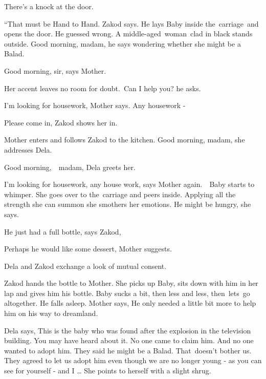 \documentclass[twoside,11pt]{book}
\begin{document}
There's a knock at the door. 

{}``That must be Hand to Hand.{\textquotedbl} Zakod says. He lays Baby inside the\ carriage\  and opens the door. He
guessed wrong. A middle-aged{\ }woman\  clad in black stands outside. {\textquotedbl}Good morning,
madam,{\textquotedbl} he says wondering whether she might be a Balad.

{\textquotedbl}Good morning, sir,{\textquotedbl} says Mother. 

Her accent leaves no room for doubt.\ {\textquotedbl}Can I help you?{\textquotedbl} he asks.

{\textquotedbl}I'm looking for housework,{\textquotedbl} Mother says. {\textquotedbl}Any housework -{\textquotedbl} 

{\textquotedbl}Please come in,{\textquotedbl} Zakod shows her in. 

Mother enters and follows Zakod to the kitchen. {\textquotedbl}Good morning, madam,{\textquotedbl} she addresses Dela.

{\textquotedbl}Good morning,\ \ madam,{\textquotedbl} Dela greets her. 

{\textquotedbl}I'm looking for housework, any house work,{\textquotedbl} says Mother again.\ \ Baby starts to whimper.
She goes over to the~carriage and peers inside. Applying all the strength she can summon she smothers her emotions.
{\textquotedbl}He might be hungry,{\textquotedbl} she says.\ 

{\textquotedbl}He just had a full bottle,{\textquotedbl} says Zakod,

{\textquotedbl}Perhaps he would like some dessert,{\textquotedbl} Mother suggests.

Dela and Zakod exchange a look of mutual consent.

Zakod hands the bottle to Mother. She picks up Baby, sits down with him in her lap and gives him his bottle. Baby sucks
a bit, then less and less, then\ lets\ go altogether. He falls asleep. Mother says, {\textquotedbl}He only needed a
little bit more to help him on his way to dreamland.{\textquotedbl} 

Dela says, {\textquotedbl}This is the baby who was found after the explosion in the television building. You may have
heard about it. No one came to claim him. And no one wanted to adopt him. They said he might be a Balad. That~doesn't
bother us. They agreed to let us adopt him even though we are no longer young - as you can see for yourself - and I
{\dots}{\textquotedbl} She points to herself with a slight shrug.
\end{document}
